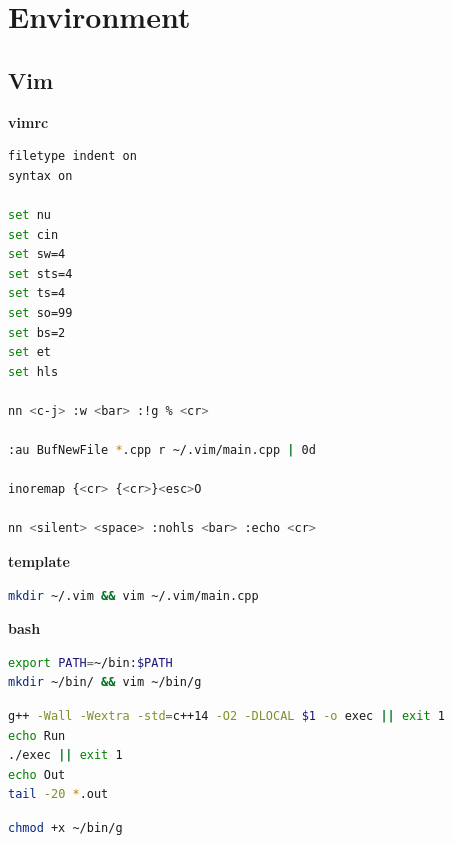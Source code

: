 \section{Environment}
\subsection{Vim}
\textbf{vimrc}
\begin{lstlisting}[language=bash]
filetype indent on
syntax on

set nu
set cin
set sw=4
set sts=4
set ts=4
set so=99
set bs=2
set et
set hls

nn <c-j> :w <bar> :!g % <cr>

:au BufNewFile *.cpp r ~/.vim/main.cpp | 0d

inoremap {<cr> {<cr>}<esc>O

nn <silent> <space> :nohls <bar> :echo <cr>
\end{lstlisting} 
    
\textbf{template}    
\begin{lstlisting}[language=bash]
mkdir ~/.vim && vim ~/.vim/main.cpp  
\end{lstlisting} 

\textbf{bash} 
\begin{lstlisting}[language=bash]
export PATH=~/bin:$PATH
mkdir ~/bin/ && vim ~/bin/g
\end{lstlisting} 

\begin{lstlisting}[language=bash]
g++ -Wall -Wextra -std=c++14 -O2 -DLOCAL $1 -o exec || exit 1
echo Run
./exec || exit 1
echo Out
tail -20 *.out
\end{lstlisting} 

\begin{lstlisting}[language=bash]
chmod +x ~/bin/g
\end{lstlisting} 
